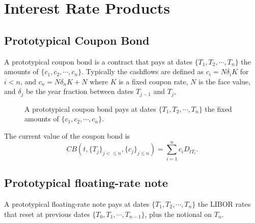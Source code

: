 \chapter{Interest Rate Products}

\section{Prototypical Coupon Bond}
A prototypical coupon bond is a contract that pays at dates 
$\{T_1,T_2,\cdots,T_{n}\}$ the amounts of $\{c_1,c_2,\cdots,c_n\}$. Typically
the cashflows are defined as $c_i=N\delta_i K$ for $i<n$, and 
$c_n=N\delta_n K+N$ where $K$ is a fixed coupon rate, $N$ is the face value,
and $\delta_j$ be the year fraction between dates $T_{j-1}$ and $T_{j}$,

\begin{figure}
  \caption{A prototypical coupon bond pays at dates
           $\{T_1,T_2,\cdots,T_{n}\}$ the fixed amounts of 
           $\{c_1,c_2,\cdots,c_n\}$.}
\end{figure}

The current value of the coupon bond is
\begin{equation}
  CB(t,\{T_j\}_{j<\le n},\{c_j\}_{j\le n}) = \sum_{i=1}^n c_i D_{tT_i}.
\end{equation}

\section{Prototypical floating-rate note}
A prototypical floating-rate note pays at dates
$\{T_1,T_2,\cdots,T_{n}\}$ the LIBOR rates that reset at previous dates
$\{T_0,T_1,\cdots,T_{n-1}\}$, plus the notional on $T_n$. 

